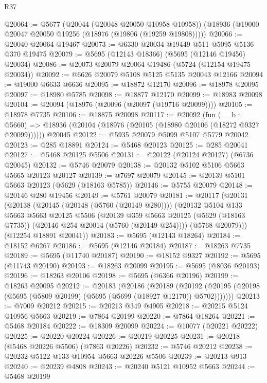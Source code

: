 \begin{lexlean}{R37}
\begin{coremodule}
@20064 := @5677
    (@20044 (@20048 @20050 @10958 @10958))
    (@18936 (@19000 @20047 @20050 @19256 (@18976 (@19806 (@19259 @19808)))))
@20066 := @20040 @20064 @19467
@20073 := @6330 @20034 @19449 @511 @5095 @5136 @370 @19475
@20079 := @5695 (@12143 @18366) (@5695 (@12146 @19456) @20034)
@20086 := @20073 @20079 @20064 @19486 (@5724 (@12154 @19475 @20034))
@20092 := @6626 @20079 @5108 @5125 @5135 @20043 @12166
@20094 := @19000 @6633 @6636
@20095 := @18872 @12170
@20096 := @18978 @20095
@20097 := @18980 @5785
@20098 := @18877 @12170
@20099 := @18983 @20098
@20104 := @20094 (@18976 (@20096 (@20097 (@19716 @20099))))
@20105 := @18978 @7735
@20106 := @18875 @20098
@20117 := @20092
    (fun (__b : @5660) => @18936 (@20104 (@18976 (@20105 (@18980 @20106 (@18272 @9327 @20099))))))
    @20045
@20122 := @5935 @20079 @5099 @5107 @5779 @20042
@20123 := @285 @18891
@20124 := @5468 @20123
@20125 := @285 @20041
@20127 := @5468 @20125 @5506
@20131 := @20122 (@20124 @20127) (@6736 @20045)
@20132 := @5746 @20079
@20138 := @20132 @5102 @5106 @5663 @5665 @20123 @20127
@20139 := @7697 @20079
@20145 := @20139 @5101 @5663 @20123 (@5629 (@18163 @5785))
@20146 := @5755 @20079
@20148 := @20146 @280 @19456
@20149 := @5761 @20079
@20181 := @20117
    (@20131
      (@20138
        (@20145 (@20148 (@5760 (@20149 @280))))
        (@20132
          @5104
          @133
          @5663
          @5663
          @20125
          @5506
          (@20139
            @359
            @5663
            @20125
            (@5629 (@18163 @7735))
            (@20146 @254 @20014 (@5760 (@20149 @254))))
          (@5768 @20079)))
      (@12254 @18891 @20041))
@20183 := @5695 (@12143 @18264)
@20184 := @18152 @6267
@20186 := @5695 (@12146 @20184)
@20187 := @18263 @7735
@20189 := @5695 (@11740 @20187)
@20190 := @18152 @9327
@20192 := @5695 (@11743 @20190)
@20193 := @18263 @20099
@20195 := @5695 (@8036 @20193)
@20196 := @18263 @20106
@20198 := @5695 (@6366 @20196)
@20199 := @18263 @20095
@20212 := @20183
    (@20186
      (@20189
        (@20192 (@20195 (@20198 (@5695 (@5809 @20199) (@5695 (@5699 (@18927 @12170)) @5702)))))))
@20213 := @7009 @20212
@20215 := @20213 @349 @4905
@20218 := @20215 @5124 @10956 @5663
@20219 := @7864 @20199
@20220 := @7864 @18264
@20221 := @5468 @20184
@20222 := @18309 @20099
@20224 := @10077 (@20221 @20222)
@20225 := @20220 @20224
@20226 := @20219 @20225
@20231 := @20218 (@5468 @20226 @5506) (@7863 @20226)
@20232 := @5746 @20212
@20238 := @20232 @5122 @133 @10954 @5663 @20226 @5506
@20239 := @20213 @913
@20240 := @20239 @4808
@20243 := @20240 @5121 @10952 @5663
@20244 := @5468 @20199

\end{coremodule}
\end{lexlean}
